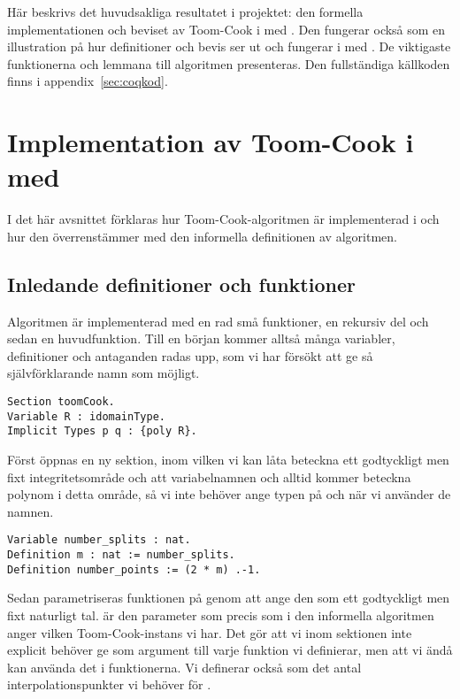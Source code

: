 Här beskrivs det huvudsakliga resultatet i projektet: den formella
implementationen och beviset av Toom-Cook i \coq{} med \ssr{}. Den fungerar
också som en illustration på hur definitioner och bevis ser ut och fungerar i
\coq{} med \ssr{}. De viktigaste funktionerna och lemmana till algoritmen
presenteras. Den fullständiga källkoden finns i appendix~\ref{sec:coqkod}.

\section{Implementation av Toom-Cook i \coq{} med \ssr{}}
\label{sec:formellimplementation}
I det här avsnittet förklaras hur Toom-Cook-algoritmen är implementerad i
\ssr{} och hur den överrenstämmer med den informella definitionen av
algoritmen.

\subsection{Inledande definitioner och funktioner}
\label{section:forminl}
Algoritmen är implementerad med en rad små funktioner, en rekursiv del och
sedan en huvudfunktion. Till en början kommer alltså många variabler,
definitioner och antaganden radas upp, som vi har försökt att ge så
självförklarande namn som möjligt.

\begin{lstlisting}
Section toomCook.
Variable R : idomainType.
Implicit Types p q : {poly R}.
\end{lstlisting}

Först öppnas en ny sektion, inom vilken vi kan låta  beteckna ett
godtyckligt men fixt integritetsområde och att variabelnamnen  och 
alltid kommer beteckna polynom i detta område, så vi inte behöver ange typen på
 och  när vi använder de namnen.

\begin{lstlisting}
Variable number_splits : nat.
Definition m : nat := number_splits.
Definition number_points := (2 * m) .-1.
\end{lstlisting}

Sedan parametriseras funktionen på  genom att ange den som ett godtyckligt
men fixt naturligt tal.  är den parameter som precis som i den informella
algoritmen anger vilken Toom-Cook-instans vi har. Det gör att vi inom sektionen
inte explicit behöver ge  som argument till varje funktion vi definierar,
men att vi ändå kan använda det i funktionerna. Vi definerar också
 som det antal interpolationspunkter vi behöver för \toomm{}.

